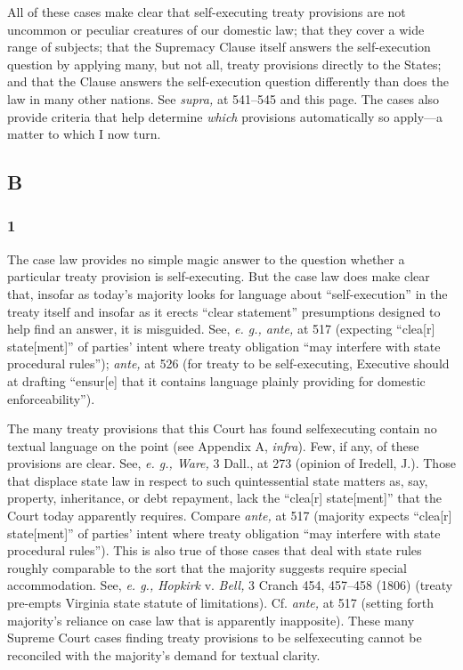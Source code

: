   All of these cases make clear that self-executing treaty provisions
are not uncommon or peculiar creatures of our domestic law; that they
cover a wide range of subjects; that the Supremacy Clause itself answers
the self-execution question by applying many, but not all, treaty
provisions directly to the States; and that the Clause answers the
self-execution question differently than does the law in many other
nations. See \emph{supra,} at 541--545 and this page. The cases also
provide criteria that help determine \emph{which} provisions automatically
so apply---a matter to which I now turn.

\subsection{B}

\subsubsection{1}

  The case law provides no simple magic answer to the question whether
a particular treaty provision is self-executing. But the case law does
make clear that, insofar as today's majority looks for language
about ``self-execution'' in the treaty itself and insofar as it
erects ``clear statement'' presumptions designed to help find an
answer, it is misguided. See, \emph{e. g., ante,} at 517 (expecting
``clea[r] state[ment]'' of parties' intent where treaty obligation
``may interfere with state procedural rules''); \emph{ante,} at 526
(for treaty to be self-executing, Executive should at drafting
``ensur[e] that it contains language plainly providing for domestic
enforceability'').\newpage 

  The many treaty provisions that this Court has found selfexecuting
contain no textual language on the point (see Appendix A,
\emph{infra}). Few, if any, of these provisions are clear. See, \emph{e.
g., Ware,} 3 Dall., at 273 (opinion of Iredell, J.). Those that
displace state law in respect to such quintessential state matters as,
say, property, inheritance, or debt repayment, lack the ``clea[r]
state[ment]'' that the Court today apparently requires. Compare
\emph{ante,} at 517 (majority expects ``clea[r] state[ment]'' of
parties' intent where treaty obligation ``may interfere with state
procedural rules''). This is also true of those cases that deal with
state rules roughly comparable to the sort that the majority suggests
require special accommodation. See, \emph{e. g., Hopkirk} v. \emph{Bell,} 3
Cranch 454, 457--458 (1806) (treaty pre-empts Virginia state statute of
limitations). Cf. \emph{ante,} at 517 (setting forth majority's reliance
on case law that is apparently inapposite). These many Supreme Court
cases finding treaty provisions to be selfexecuting cannot be reconciled
with the majority's demand for textual clarity.

